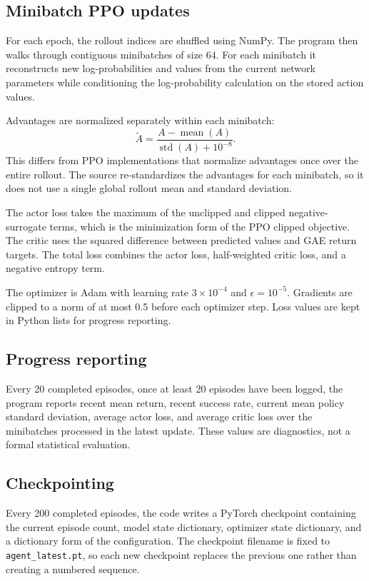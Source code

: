 \documentclass[11pt,a4paper]{article}
\begin{document}
\subsection{Minibatch PPO updates}
For each epoch, the rollout indices are shuffled using NumPy. The program then walks through contiguous minibatches of size 64. For each minibatch it reconstructs new log-probabilities and values from the current network parameters while conditioning the log-probability calculation on the stored action values.

Advantages are normalized separately within each minibatch:
\begin{equation}
\widetilde{A}
= \frac{A-\operatorname{mean}(A)}{\operatorname{std}(A)+10^{-8}}.
\end{equation}
This differs from PPO implementations that normalize advantages once over the entire rollout. The source re-standardizes the advantages for each minibatch, so it does not use a single global rollout mean and standard deviation.

The actor loss takes the maximum of the unclipped and clipped negative-surrogate terms, which is the minimization form of the PPO clipped objective. The critic uses the squared difference between predicted values and GAE return targets. The total loss combines the actor loss, half-weighted critic loss, and a negative entropy term.

The optimizer is Adam with learning rate $3\times10^{-4}$ and $\epsilon=10^{-5}$. Gradients are clipped to a norm of at most 0.5 before each optimizer step. Loss values are kept in Python lists for progress reporting.

\subsection{Progress reporting}
Every 20 completed episodes, once at least 20 episodes have been logged, the program reports recent mean return, recent success rate, current mean policy standard deviation, average actor loss, and average critic loss over the minibatches processed in the latest update. These values are diagnostics, not a formal statistical evaluation.

\subsection{Checkpointing}
Every 200 completed episodes, the code writes a PyTorch checkpoint containing the current episode count, model state dictionary, optimizer state dictionary, and a dictionary form of the configuration. The checkpoint filename is fixed to \texttt{agent\_latest.pt}, so each new checkpoint replaces the previous one rather than creating a numbered sequence.
\end{document}
